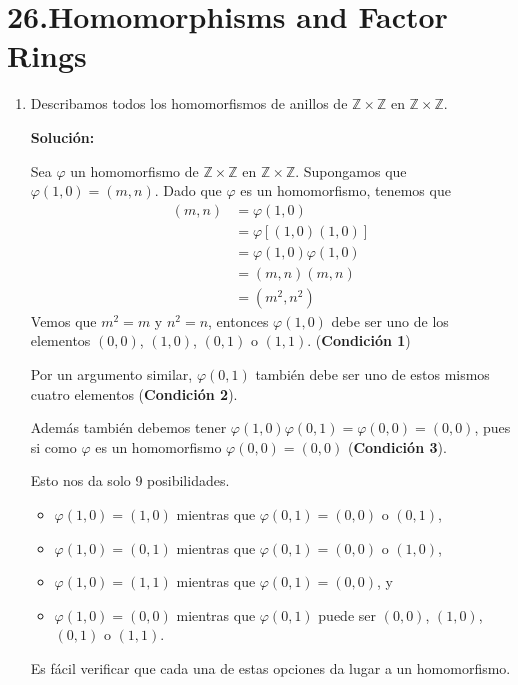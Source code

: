 \section*{26.Homomorphisms and Factor Rings}

\begin{enumerate}
    \item Describamos todos los homomorfismos de anillos de $\mathbb{Z} \times \mathbb{Z}$ en $\mathbb{Z} \times \mathbb{Z}$.

\textbf{Solución:}

Sea $\varphi$ un homomorfismo de $\mathbb{Z} \times \mathbb{Z}$ en $\mathbb{Z} \times \mathbb{Z}$. Supongamos que $\varphi(1, 0) = (m, n)$. Dado que $\varphi$ es un homomorfismo, tenemos que 
\begin{align*}
    (m,n) &= \varphi(1, 0) \\ 
    &= \varphi[(1, 0)(1, 0)] \\ 
    &= \varphi(1, 0)\varphi(1, 0) \\
    &= (m,n)(m,n) \\
    &= (m^2,n^2)
\end{align*}
Vemos que $m^2 = m$ y $n^2 = n$, entonces $\varphi(1, 0)$ debe ser uno de los elementos $(0, 0)$, $(1, 0)$, $(0, 1)$ o $(1, 1)$. (\textbf{Condición 1})

Por un argumento similar, $\varphi(0, 1)$ también debe ser uno de estos mismos cuatro elementos (\textbf{Condición 2}).


Además también debemos tener $\varphi(1, 0)\varphi(0, 1) = \varphi(0, 0) = (0, 0)$, pues si como $\varphi$ es un homomorfismo $\varphi(0,0)=(0,0)$ (\textbf{Condición 3}). 

Esto nos da solo 9 posibilidades.

\begin{itemize}
    \item $\varphi(1, 0) = (1, 0)$ mientras que $\varphi(0, 1) = (0, 0)$ o $(0, 1)$,
    \item $\varphi(1, 0) = (0, 1)$ mientras que $\varphi(0, 1) = (0, 0)$ o $(1, 0)$,
    \item $\varphi(1, 0) = (1, 1)$ mientras que $\varphi(0, 1) = (0, 0)$, y
    \item $\varphi(1, 0) = (0, 0)$ mientras que $\varphi(0, 1)$ puede ser $(0, 0)$, $(1, 0)$, $(0, 1)$ o $(1, 1)$.
\end{itemize}

Es fácil verificar que cada una de estas opciones da lugar a un homomorfismo.


\end{enumerate}
